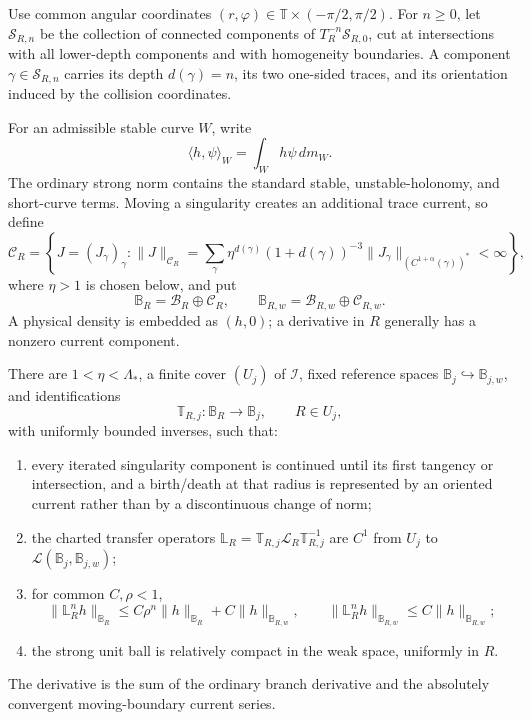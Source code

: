 Use common angular coordinates
\((r,\varphi)\in\mathbb T\times(-\pi/2,\pi/2)\).  For \(n\ge0\), let
\(\mathscr S_{R,n}\) be the collection of connected components of
\(T_R^{-n}\mathscr S_{R,0}\), cut at intersections with all lower-depth
components and with homogeneity boundaries.  A component
\(\gamma\in\mathscr S_{R,n}\) carries its depth \(d(\gamma)=n\), its two
one-sided traces, and its orientation induced by the collision coordinates.

For an admissible stable curve \(W\), write
\[
 \langle h,\psi\rangle_W=\int_Wh\psi\,dm_W.
\]
The ordinary strong norm contains the standard stable, unstable-holonomy, and
short-curve terms.  Moving a singularity creates an additional trace current,
so define
\[
 \mathcal C_R
 =\left\{J=(J_\gamma)_{\gamma}:
 \|J\|_{\mathcal C_R}
 =\sum_{\gamma}\eta^{d(\gamma)}
 (1+d(\gamma))^{-3}
 \|J_\gamma\|_{(C^{1+\alpha}(\gamma))^*}<\infty
 \right\},
\]
where \(\eta>1\) is chosen below, and put
\[
 \mathbb B_R=\mathcal B_R\oplus\mathcal C_R,
 \qquad
 \mathbb B_{R,w}=\mathcal B_{R,w}\oplus\mathcal C_{R,w}.
\]
A physical density is embedded as \((h,0)\); a derivative in \(R\) generally
has a nonzero current component.

\begin{lemma}
\label{lem:r3-a2-atlas}
There are \(1<\eta<\Lambda_*\), a finite cover \((U_j)\) of
\(\mathcal I\), fixed reference spaces
\(\mathbb B_j\hookrightarrow\mathbb B_{j,w}\), and identifications
\[
 \mathbb T_{R,j}:\mathbb B_R\longrightarrow\mathbb B_j,
 \qquad R\in U_j,
\]
with uniformly bounded inverses, such that:
\begin{enumerate}[label=(\roman*)]
\item every iterated singularity component is continued until its first
      tangency or intersection, and a birth/death at that radius is represented
      by an oriented current rather than by a discontinuous change of norm;
\item the charted transfer operators
\(\mathbb L_R=\mathbb T_{R,j}\mathcal L_R\mathbb T_{R,j}^{-1}\) are
\(C^1\) from \(U_j\) to
\(\mathcal L(\mathbb B_j,\mathbb B_{j,w})\);
\item for common \(C,\rho<1\),
\[
 \|\mathbb L_R^nh\|_{\mathbb B_R}
 \le C\rho^n\|h\|_{\mathbb B_R}
     +C\|h\|_{\mathbb B_{R,w}},
 \qquad
 \|\mathbb L_R^nh\|_{\mathbb B_{R,w}}
 \le C\|h\|_{\mathbb B_{R,w}};
\]
\item the strong unit ball is relatively compact in the weak space, uniformly
      in \(R\).
\end{enumerate}
The derivative is the sum of the ordinary branch derivative and the absolutely
convergent moving-boundary current series.
\end{lemma}

